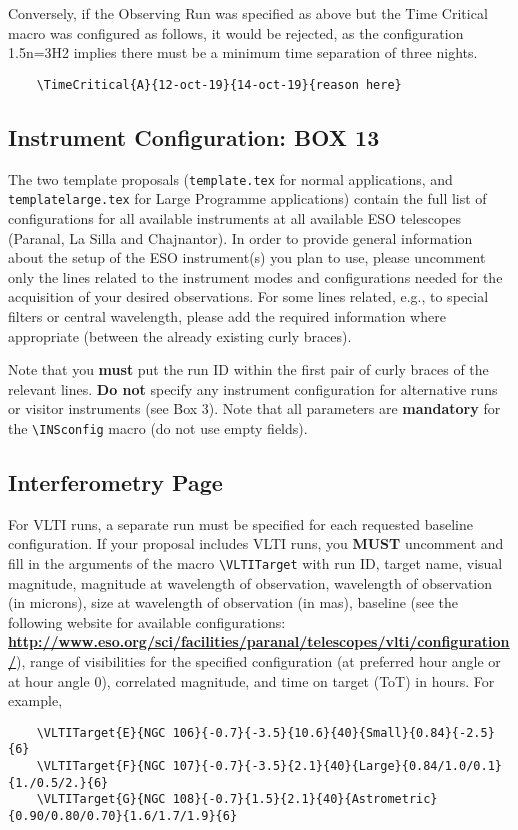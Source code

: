\documentclass{article}
\begin{document}
Conversely, if the Observing Run was specified as above but the Time Critical macro was configured as follows,
it would be rejected, as the configuration 1.5n=3H2 implies there must be a minimum time separation of three nights.
\begin{verbatim}
    \TimeCritical{A}{12-oct-19}{14-oct-19}{reason here}
\end{verbatim}

\subsection{Instrument Configuration: {\bf BOX 13}}

The two template proposals ({\tt template.tex} for normal
applications, and {\tt templatelarge.tex} for Large Programme applications) contain
the full list of configurations for all available instruments at all
available ESO telescopes (Paranal, La Silla and Chajnantor).  In order
to provide general information about the setup of the ESO instrument(s) you plan
to use, please uncomment only the lines related to the instrument
modes and configurations needed for the acquisition of your desired
observations.  For some lines related, e.g., to special filters or
central wavelength, please add the required information where
appropriate (between the already existing curly
braces).

Note that you {\bf must} put the run ID within the first pair of curly
braces of the relevant lines. {\bf Do not} specify any instrument
configuration for alternative runs or visitor instruments (see Box 3). 
Note that all parameters are {\bf mandatory} for the \verb|\INSconfig|
macro (do not use empty fields).

\subsection{Interferometry Page}
\label{sec:vlti}

For VLTI runs, a separate run must be specified for each requested baseline configuration.
If your proposal includes VLTI runs, you {\bf MUST} uncomment and fill in the arguments of the macro \verb|\VLTITarget| with run ID, target name, visual
magnitude, magnitude at wavelength of observation, wavelength of
observation (in microns), size at wavelength of observation (in mas),
baseline (see the following website for available configurations:
\href{http://www.eso.org/sci/facilities/paranal/telescopes/vlti/configuration/}{\bf\underline{http://www.eso.org/sci/facilities/paranal/telescopes/vlti/configuration/}}), 
range of visibilities for the specified configuration (at preferred hour angle or at hour angle 0), correlated magnitude, and time on target (ToT) in hours. For example,
\begin{verbatim}
    \VLTITarget{E}{NGC 106}{-0.7}{-3.5}{10.6}{40}{Small}{0.84}{-2.5}{6}
    \VLTITarget{F}{NGC 107}{-0.7}{-3.5}{2.1}{40}{Large}{0.84/1.0/0.1}{1./0.5/2.}{6}
    \VLTITarget{G}{NGC 108}{-0.7}{1.5}{2.1}{40}{Astrometric}{0.90/0.80/0.70}{1.6/1.7/1.9}{6}
\end{verbatim}
\end{document}
